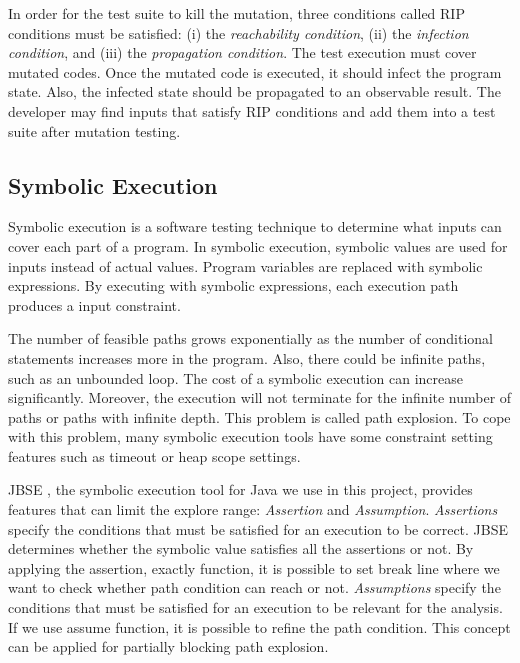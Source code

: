 \documentclass{article}
\begin{document}
In order for the test suite to kill the mutation, three conditions called RIP conditions must be satisfied: (i) the \emph{reachability condition}, (ii) the \emph{infection condition}, and (iii) the \emph{propagation condition}. The test execution must cover mutated codes. Once the mutated code is executed, it should infect the program state. Also, the infected state should be propagated to an observable result. The developer may find inputs that satisfy RIP conditions and add them into a test suite after mutation testing.

\subsection{Symbolic Execution}
\iffalse
1. symbolic execution이 뭔지
2. 한계
    path explosion
3. JBSE에 대해서 쓸 거 있으면 여기 쓰기
    3.1. Assertion and Assumption
        3.1.1 Assertion -> \javainline{ass3rt}
        Assertions specify the conditions that must satisfied for an execution to be correct. JBSE attempts to determine whether some inputs exist that satisfy all the assumptions and make fail at least one assertion. By applying the assertion, exactly ass3rt() function, it is possible to set break line where we want to check whether path condition can reach or not
        3.1.2 Assumption -> assume
        Assumptions specify the conditions that must be satisfied for an execution to be relevant for the analysis. If we use assume function, it is possible to refine path condition. This concept can be applied for partially blocking path explosion.
\fi
Symbolic execution is a software testing technique to determine what inputs can cover each part of a program. In symbolic execution, symbolic values are used for inputs instead of actual values. Program variables are replaced with symbolic expressions. By executing with symbolic expressions, each execution path produces a input constraint.

The number of feasible paths grows exponentially as the number of conditional statements increases more in the program. Also, there could be infinite paths, such as an unbounded loop. The cost of a symbolic execution can increase significantly. Moreover, the execution will not terminate for the infinite number of paths or paths with infinite depth. This problem is called path explosion. To cope with this problem, many symbolic execution tools have some constraint setting features such as timeout or heap scope settings. 

JBSE \cite{JBSE}, the symbolic execution tool for Java we use in this project, provides features that can limit the explore range: \emph{Assertion} and \emph{Assumption}. \emph{Assertions} specify the conditions that must be satisfied for an execution to be correct. JBSE determines whether the symbolic value satisfies all the assertions or not. By applying the assertion, exactly  function, it is possible to set break line where we want to check whether path condition can reach or not. \emph{Assumptions} specify the conditions that must be satisfied for an execution to be relevant for the analysis. If we use assume function, it is possible to refine the path condition. This concept can be applied for partially blocking path explosion.
\end{document}
